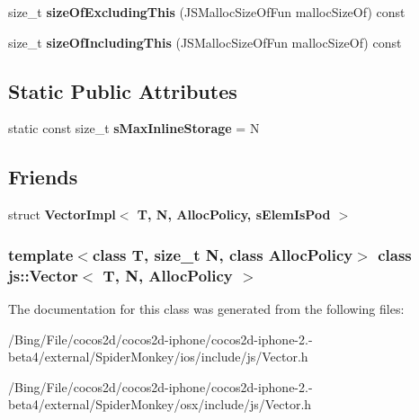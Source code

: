 \begin{DoxyCompactItemize}
\item 
\hypertarget{classjs_1_1_vector_aa78c701659c57b89674cc0bc692f18bb}{size\-\_\-t {\bfseries size\-Of\-Excluding\-This} (J\-S\-Malloc\-Size\-Of\-Fun malloc\-Size\-Of) const }\label{classjs_1_1_vector_aa78c701659c57b89674cc0bc692f18bb}

\item 
\hypertarget{classjs_1_1_vector_a8bd12c16d0213ace355fc41f653242d9}{size\-\_\-t {\bfseries size\-Of\-Including\-This} (J\-S\-Malloc\-Size\-Of\-Fun malloc\-Size\-Of) const }\label{classjs_1_1_vector_a8bd12c16d0213ace355fc41f653242d9}

\end{DoxyCompactItemize}
\subsection*{Static Public Attributes}
\begin{DoxyCompactItemize}
\item 
\hypertarget{classjs_1_1_vector_a58824443e52d5df03cf93269b0faf11a}{static const size\-\_\-t {\bfseries s\-Max\-Inline\-Storage} = N}\label{classjs_1_1_vector_a58824443e52d5df03cf93269b0faf11a}

\end{DoxyCompactItemize}
\subsection*{Friends}
\begin{DoxyCompactItemize}
\item 
\hypertarget{classjs_1_1_vector_a47edab0dfe2fd77494d5f98f6a1520b3}{struct {\bfseries Vector\-Impl$<$ T, N, Alloc\-Policy, s\-Elem\-Is\-Pod $>$}}\label{classjs_1_1_vector_a47edab0dfe2fd77494d5f98f6a1520b3}

\end{DoxyCompactItemize}
\subsubsection*{template$<$class T, size\-\_\-t N, class Alloc\-Policy$>$ class js\-::\-Vector$<$ T, N, Alloc\-Policy $>$}



The documentation for this class was generated from the following files\-:\begin{DoxyCompactItemize}
\item 
/\-Bing/\-File/cocos2d/cocos2d-\/iphone/cocos2d-\/iphone-\/2.-\/beta4/external/\-Spider\-Monkey/ios/include/js/Vector.\-h\item 
/\-Bing/\-File/cocos2d/cocos2d-\/iphone/cocos2d-\/iphone-\/2.-\/beta4/external/\-Spider\-Monkey/osx/include/js/Vector.\-h\end{DoxyCompactItemize}
